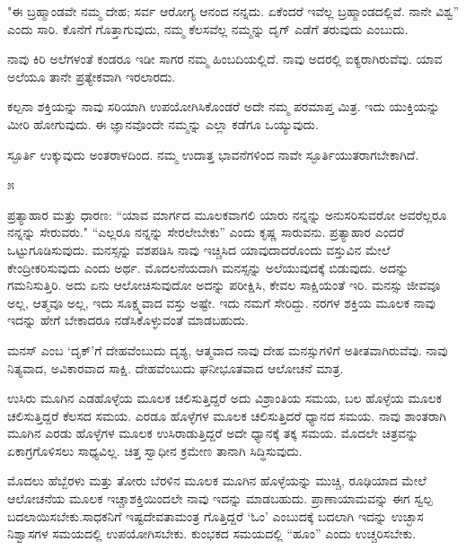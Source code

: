 \vskip 2pt

"ಈ ಬ್ರಹ್ಮಾಂಡವೇ ನಮ್ಮ ದೇಹ; ಸರ್ವ ಆರೋಗ್ಯ ಆನಂದ ನನ್ನದು. ಏಕೆಂದರೆ ಇವೆಲ್ಲ ಬ್ರಹ್ಮಾಂಡದಲ್ಲಿವೆ. ನಾನೇ ವಿಶ್ವ'' ಎಂದು ಸಾರಿ. ಕೊನೆಗೆ ಗೊತ್ತಾಗುವುದು, ನಮ್ಮ ಕೆಲಸವೆಲ್ಲ ನಮ್ಮನ್ನು ದೃಗ್ ಎಡೆಗೆ ತರುವುದು ಎಂಬುದು.

\vskip 2pt

ನಾವು ಕಿರಿ ಅಲೆಗಳಂತೆ ಕಂಡರೂ ಇಡೀ ಸಾಗರ ನಮ್ಮ ಹಿಂಬದಿಯಲ್ಲಿದೆ. ನಾವು ಅದರಲ್ಲಿ ಐಕ್ಯರಾಗಿರುವೆವು. ಯಾವ ಅಲೆಯೂ ತಾನೇ ಪ್ರತ್ಯೇಕವಾಗಿ ಇರಲಾರದು.

\vskip 2pt

ಕಲ್ಪನಾ ಶಕ್ತಿಯನ್ನು ನಾವು ಸರಿಯಾಗಿ ಉಪಯೋಗಿಸಿಕೊಂಡರೆ ಅದೇ ನಮ್ಮ ಪರಮಾಪ್ತ ಮಿತ್ರ. ಇದು ಯುಕ್ತಿಯನ್ನು ಮೀರಿ ಹೋಗುವುದು. ಈ ಜ್ಞಾನವೊಂದೇ ನಮ್ಮನ್ನು ಎಲ್ಲಾ ಕಡೆಗೂ ಒಯ್ಯುವುದು.

\vskip 2pt

ಸ್ಫೂರ್ತಿ ಉಕ್ಕುವುದು ಅಂತರಾಳದಿಂದ. ನಮ್ಮ ಉದಾತ್ತ ಭಾವನೆಗಳಿಂದ ನಾವೇ ಸ್ಫೂರ್ತಿಯುತರಾಗಬೇಕಾಗಿದೆ.

\begin{center}
೫
\end{center}

ಪ್ರತ್ಯಾಹಾರ ಮತ್ತು ಧಾರಣ: “ಯಾವ ಮಾರ್ಗದ ಮೂಲಕವಾಗಲಿ ಯಾರು ನನ್ನನ್ನು ಅನುಸರಿಸುವರೋ ಅವರೆಲ್ಲರೂ ನನ್ನನ್ನು ಸೇರುವರು." “ಎಲ್ಲರೂ ನನ್ನನ್ನು ಸೇರಲೇಬೇಕು'' ಎಂದು ಕೃಷ್ಣ ಸಾರುವನು. ಪ್ರತ್ಯಾಹಾರ ಎಂದರೆ ಒಟ್ಟುಗೂಡಿಸುವುದು. ಮನಸ್ಸನ್ನು ವಶಪಡಿಸಿ ನಾವು ಇಚ್ಚಿಸಿದ ಯಾವುದಾದರೊಂದು ವಸ್ತುವಿನ ಮೇಲೆ ಕೇಂದ್ರೀಕರಿಸುವುದು ಎಂದು ಅರ್ಥ. ಮೊದಲನೆಯದಾಗಿ ಮನಸ್ಸನ್ನು ಅಲೆಯುವುದಕ್ಕೆ ಬಿಡುವುದು. ಅದನ್ನು ಗಮನಿಸುತ್ತಿರಿ. ಅದು ಏನು ಆಲೋಚಿಸುವುದೋ ಅದನ್ನು ಪರೀಕ್ಷಿಸಿ, ಕೇವಲ ಸಾಕ್ಷಿಯಂತೆ ಇರಿ. ಮನಸ್ಸು ಜೀವವೂ ಅಲ್ಲ, ಆತ್ಮವೂ ಅಲ್ಲ, ಇದು ಸೂಕ್ಷ್ಮವಾದ ವಸ್ತು ಅಷ್ಟೇ. ಇದು ನಮಗೆ ಸೇರಿದ್ದು. ನರಗಳ ಶಕ್ತಿಯ ಮೂಲಕ ನಾವು ಇದನ್ನು ಹೇಗೆ ಬೇಕಾದರೂ ನಡೆಸಿಕೊಳ್ಳುವಂತೆ ಮಾಡಬಹುದು.

\vskip 2pt

ಮನಸ್ ಎಂಬ `ದೃಕ್'ಗೆ ದೇಹವೆಂಬುದು ದೃಶ್ಯ, ಆತ್ಮವಾದ ನಾವು ದೇಹ ಮನಸ್ಸುಗಳಿಗೆ ಅತೀತವಾಗಿರುವೆವು. ನಾವು ನಿತ್ಯವಾದ, ಅವಿಕಾರವಾದ ಸಾಕ್ಷಿ. ದೇಹವೆಂಬುದು ಘನೀಭೂತವಾದ ಆಲೋಚನೆ ಮಾತ್ರ.

\vskip 2pt

ಉಸಿರು ಮೂಗಿನ ಎಡಹೊಳ್ಳೆಯ ಮೂಲಕ ಚಲಿಸುತ್ತಿದ್ದರೆ ಅದು ವಿಶ್ರಾಂತಿಯ ಸಮಯ, ಬಲ ಹೊಳ್ಳೆಯ ಮೂಲಕ ಚಲಿಸುತ್ತಿದ್ದರೆ ಕೆಲಸದ ಸಮಯ. ಎರಡೂ ಹೊಳ್ಳೆಗಳ ಮೂಲಕ ಚಲಿಸುತ್ತಿದರೆ ಧ್ಯಾನದ ಸಮಯ. ನಾವು ಶಾಂತರಾಗಿ ಮೂಗಿನ ಎರಡು ಹೊಳ್ಳೆಗಳ ಮೂಲಕ ಉಸಿರಾಡುತ್ತಿದ್ದರೆ ಅದೇ ಧ್ಯಾನಕ್ಕೆ ತಕ್ಕ ಸಮಯ. ಮೊದಲೇ ಚಿತ್ರವನ್ನು ಏಕಾಗ್ರಗೊಳಿಸಲು ಸಾಧ್ಯವಿಲ್ಲ. ಚಿತ್ತ ಸ್ವಾಧೀನ ಕ್ರಮೇಣ ತಾನಾಗಿ ಸಿದ್ಧಿಸುವುದು.

\vskip 2pt

ಮೊದಲು ಹೆಬ್ಬೆರಳು ಮತ್ತು ತೋರು ಬೆರಳಿನ ಮೂಲಕ ಮೂಗಿನ ಹೊಳ್ಳೆಯನ್ನು ಮುಚ್ಚಿ, ರೂಢಿಯಾದ ಮೇಲೆ ಆಲೋಚನೆಯ ಮೂಲಕ ಇಚ್ಚಾಶಕ್ತಿಯಿಂದಲೇ ನಾವು ಇದನ್ನು ಮಾಡಬಹುದು. ಪ್ರಾಣಾಯಾಮವನ್ನು ಈಗ ಸ್ವಲ್ಪ ಬದಲಾಯಿಸಬೇಕು.\break ಸಾಧಕನಿಗೆ ಇಷ್ಟದೇವತಾಮಂತ್ರ ಗೊತ್ತಿದ್ದರೆ `ಓಂ' ಎಂಬುದಕ್ಕೆ ಬದಲಾಗಿ ಇದನ್ನು ಉಚ್ಛಾಸ ನಿಶ್ವಾಸಗಳ ಸಮಯದಲ್ಲಿ ಉಪಯೋಗಿಸಬೇಕು. ಕುಂಭಕದ ಸಮಯದಲ್ಲಿ “ಹೂಂ'' ಎಂದು ಉಚ್ಚರಿಸಬೇಕು.

